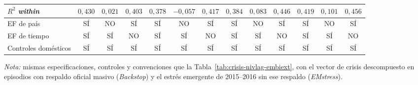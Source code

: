\begin{landscape}
\begin{table}
\begin{adjustbox}{max width=\linewidth, max totalheight=\tablaalto\textheight}
\begin{tabular}{l c ccc ccc ccc cc}
$R^2$ \textit{within} & $0{,}430$ & $0{,}021$ & $0{,}403$ & $0{,}378$ & $-0{,}057$ & $0{,}417$ & $0{,}384$ & $0{,}083$ & $0{,}446$ & $0{,}419$ & $0{,}101$ & $0{,}456$ \\
\midrule
EF de país & SÍ & NO & SÍ & SÍ & NO & SÍ & SÍ & NO & SÍ & SÍ & NO & SÍ \\
EF de tiempo & SÍ & SÍ & NO & SÍ & SÍ & NO & SÍ & SÍ & NO & SÍ & SÍ & NO \\
Controles domésticos & SÍ & SÍ & SÍ & SÍ & SÍ & SÍ & SÍ & SÍ & SÍ & SÍ & SÍ & SÍ \\
\bottomrule
\end{tabular}
\end{adjustbox}
\par\smallskip\parbox{\linewidth}{\scriptsize \textit{Nota:} mismas especificaciones, controles y convenciones que la Tabla~\ref{tab:crisis-nivlag-embiext}, con el vector de crisis descompuesto en episodios con respaldo oficial masivo (\textit{Backstop}) y el estrés emergente de 2015--2016 sin ese respaldo (\textit{EMstress}).}
\end{table}
\end{landscape}
